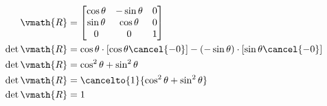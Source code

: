 \documentclass{gif7001}
\begin{document}
\begin{enumerate}
\begin{align*}
        \vmath{R} &=
        \begin{bmatrix}
            \cos \theta & -\sin \theta & 0 \\
            \sin \theta & \cos \theta & 0 \\
            0 & 0 & 1 \\
        \end{bmatrix} \\
        \det \vmath{R} &= \cos \theta \cdot \left[\cos \theta \cancel{- 0}\right] - \left(- \sin \theta \right) \cdot \left[ \sin \theta \cancel{- 0} \right] \\
        \det \vmath{R} &= \cos^2 \theta + \sin^2 \theta \\
        \det \vmath{R} &= \cancelto{1}{\cos^2 \theta + \sin^2 \theta} \\
        \det \vmath{R} &= 1
    \end{align*}
\end{enumerate}
\end{document}
